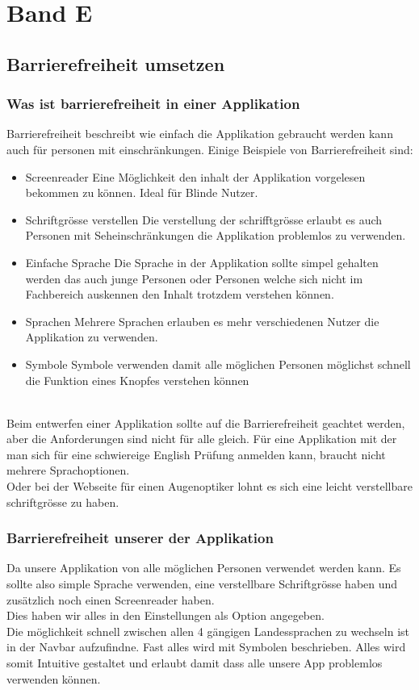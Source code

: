 \documentclass[10pt]{article}
\begin{document}
	\pagebreak
	
	\section{Band E}
	\subsection{Barrierefreiheit umsetzen}
	\subsubsection{Was ist barrierefreiheit in einer Applikation}
	Barrierefreiheit beschreibt wie einfach die Applikation gebraucht werden kann auch für personen mit einschränkungen.
	Einige Beispiele von Barrierefreiheit sind:
	\begin{itemize}
		\item Screenreader
		Eine Möglichkeit den inhalt der Applikation vorgelesen bekommen zu können. Ideal für Blinde Nutzer.
		\item Schriftgrösse verstellen
		Die verstellung der schrifftgrösse erlaubt es auch Personen mit Seheinschränkungen die Applikation problemlos zu verwenden.
		\item Einfache Sprache
		Die Sprache in der Applikation sollte simpel gehalten werden das auch junge Personen oder Personen welche sich nicht im Fachbereich auskennen den Inhalt trotzdem verstehen können.
		\item Sprachen
		Mehrere Sprachen erlauben es mehr verschiedenen Nutzer die Applikation zu verwenden.
		\item Symbole
		Symbole verwenden damit alle möglichen Personen möglichst schnell die Funktion eines Knopfes verstehen können\\\\
	\end{itemize}
	
	Beim entwerfen einer Applikation sollte auf die Barrierefreiheit geachtet werden, aber die Anforderungen sind nicht für alle gleich. Für eine Applikation mit der man sich für eine schwiereige English Prüfung anmelden kann, braucht nicht mehrere Sprachoptionen.\\
	Oder bei der Webseite für einen Augenoptiker lohnt es sich eine leicht verstellbare schriftgrösse zu haben.
	\subsubsection{Barrierefreiheit unserer der Applikation}
	Da unsere Applikation von alle möglichen Personen verwendet werden kann. Es sollte also simple Sprache verwenden, eine verstellbare Schriftgrösse haben und zusätzlich noch einen Screenreader haben.\\ Dies haben wir alles in den Einstellungen als Option angegeben.\\
	Die möglichkeit schnell zwischen allen 4 gängigen Landessprachen zu wechseln ist in der Navbar aufzufindne.
	Fast alles wird mit Symbolen beschrieben. Alles wird somit Intuitive gestaltet und erlaubt damit dass alle unsere App problemlos verwenden können.
	
\end{document}
